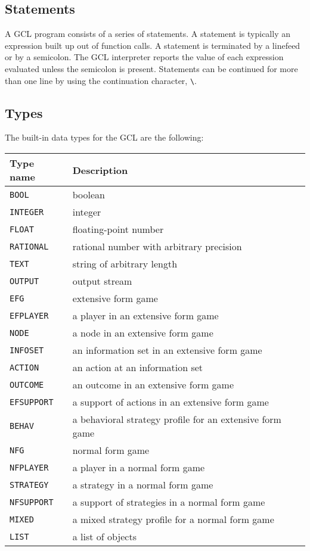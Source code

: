 \subsection{Statements}

A GCL program consists of a series of statements.  A statement is
typically an expression built up out of function calls.  A statement
is terminated by a linefeed or by a semicolon.  The GCL interpreter
reports the value of each expression evaluated unless the semicolon is
present. Statements can be continued for more than one line by using
the continuation character, \verb+\+.   

\subsection{Types}

The built-in data types for the GCL are the following:  

\medskip

\begin{tabular} {|l||l|} \hline
Type name	& Description \\ \hline
{\tt BOOL} 	& boolean \\
{\tt INTEGER} 	& integer \\ 
{\tt FLOAT} 	& floating-point number \\
{\tt RATIONAL} 	& rational number with arbitrary precision \\
{\tt TEXT}	& string of arbitrary length \\
{\tt OUTPUT}	& output stream \\ \hline
{\tt EFG}	& extensive form game \\
{\tt EFPLAYER}	& a player in an extensive form game \\
{\tt NODE}	& a node in an extensive form game \\ 
{\tt INFOSET}	& an information set in an extensive form game \\
{\tt ACTION}	& an action at an information set \\
{\tt OUTCOME}	& an outcome in an extensive form game \\
{\tt EFSUPPORT}	& a support of actions in an extensive form game \\
{\tt BEHAV}	& a behavioral strategy profile for an extensive form game \\ \hline
{\tt NFG}	& normal form game \\
{\tt NFPLAYER}	& a player in a normal form game \\
{\tt STRATEGY}	& a strategy in a normal form game \\
{\tt NFSUPPORT}	& a support of strategies in a normal form game \\
{\tt MIXED}	& a mixed strategy profile for a normal form game \\ \hline
{\tt LIST}	& a list of objects \\ \hline
\end{tabular}

